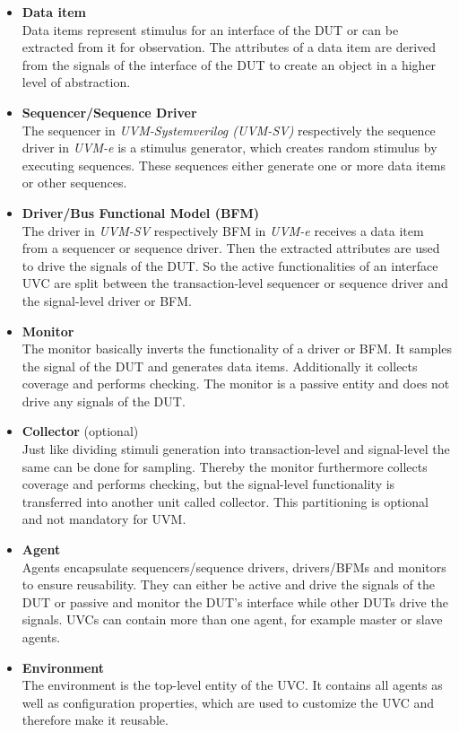 \begin{itemize}
  \item \textbf{Data item}\\
  Data items represent stimulus for an interface of the
  DUT or can be extracted from it for observation.
  The attributes of a data item are derived from the signals of the interface of the
  DUT to create an object in a higher level of abstraction.
  \item \textbf{Sequencer/Sequence Driver}\\
  The sequencer in \emph{UVM-Systemverilog (UVM-SV)} respectively the sequence
  driver in \emph{UVM-e} is a stimulus generator, which creates random
  stimulus by executing sequences. These sequences either generate one or more
  data items or other sequences.
  \item \textbf{Driver/Bus Functional Model (BFM)}\\
  The driver in \emph{UVM-SV} respectively BFM in \emph{UVM-e} receives a data
  item from a sequencer or sequence driver. Then the extracted attributes are
  used to drive the signals of the DUT. So the active functionalities of an
  interface UVC are split between the transaction-level sequencer or sequence
  driver and the signal-level driver or BFM.
  \item \textbf{Monitor}\\
  The monitor basically inverts the functionality of a driver or BFM. It samples
  the signal of the DUT and generates data items. Additionally it collects coverage
  and performs checking. The monitor is a passive entity and does not drive any
  signals of the DUT.
  \item \textbf{Collector} (optional)\\
  Just like dividing stimuli generation into transaction-level and signal-level
  the same can be done for sampling. Thereby the monitor furthermore collects
  coverage and performs checking, but the signal-level functionality is
  transferred into another unit called collector. This partitioning is optional
  and not mandatory for UVM.
  \item \textbf{Agent}\\
  Agents encapsulate sequencers/sequence drivers, drivers/BFMs and monitors to
  ensure reusability. They can either be active and drive the signals of the DUT
  or passive and monitor the DUT's interface while other DUTs drive the signals.
  UVCs can contain more than one agent, for example master or slave agents.
  \item \textbf{Environment}\\
  The environment is the top-level entity of the UVC. It contains all agents as
  well as configuration properties, which are used to customize the UVC and
  therefore make it reusable.
\end{itemize}

